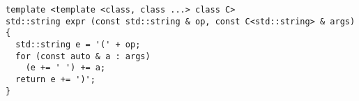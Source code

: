

\begin{lstlisting}[style=c++]
template <template <class, class ...> class C>
std::string expr (const std::string & op, const C<std::string> & args)
{
  std::string e = '(' + op;
  for (const auto & a : args)
    (e += ' ') += a;
  return e += ')';
}
\end{lstlisting}

